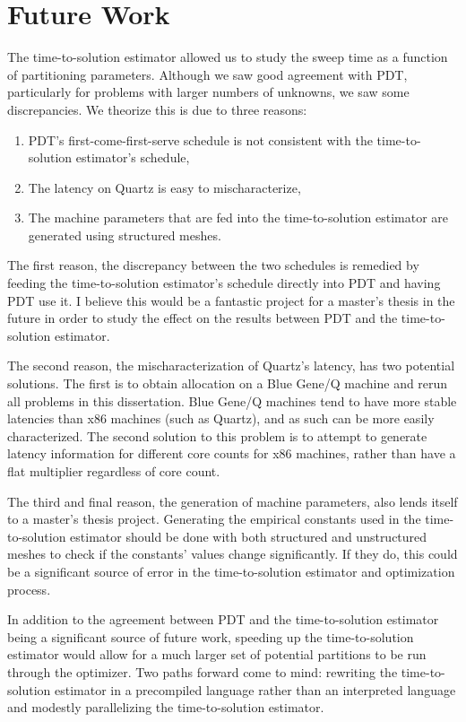 \section{Future Work}

The time-to-solution estimator allowed us to study the sweep time as a function of partitioning parameters.
Although we saw good agreement with PDT, particularly for problems with larger numbers of unknowns, we saw some discrepancies.
We theorize this is due to three reasons:
\begin{enumerate}
\item PDT's first-come-first-serve schedule is not consistent with the time-to-solution estimator's schedule,
\item The latency on Quartz is easy to mischaracterize,
\item The machine parameters that are fed into the time-to-solution estimator are generated using structured meshes.
\end{enumerate}

The first reason, the discrepancy between the two schedules is remedied by feeding the time-to-solution estimator's schedule directly into PDT and having PDT use it.
I believe this would be a fantastic project for a master's thesis in the future in order to study the effect on the results between PDT and the time-to-solution estimator.

The second reason, the mischaracterization of Quartz's latency, has two potential solutions.
The first is to obtain allocation on a Blue Gene/Q machine and rerun all problems in this dissertation.
Blue Gene/Q machines tend to have more stable latencies than x86 machines (such as Quartz), and as such can be more easily characterized.
The second solution to this problem is to attempt to generate latency information for different core counts for x86 machines, rather than have a flat multiplier regardless of core count. 

The third and final reason, the generation of machine parameters, also lends itself to a master's thesis project.
Generating the empirical constants used in the time-to-solution estimator should be done with both structured and unstructured meshes to check if the constants' values change significantly.
If they do, this could be a significant source of error in the time-to-solution estimator and optimization process.

In addition to the agreement between PDT and the time-to-solution estimator being a significant source of future work, speeding up the time-to-solution estimator would allow for a much larger set of potential partitions to be run through the optimizer.
Two paths forward come to mind: rewriting the time-to-solution estimator in a precompiled language rather than an interpreted language and modestly parallelizing the time-to-solution estimator.

